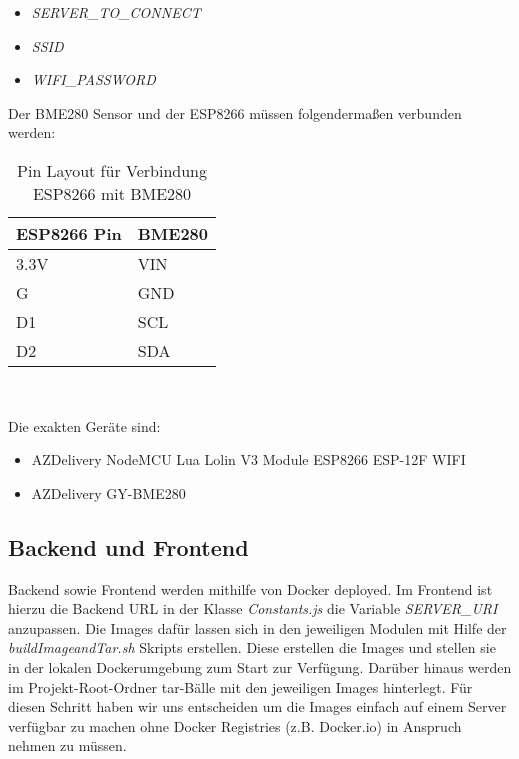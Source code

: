 \begin{itemize}
	\item \textit{SERVER\_TO\_CONNECT}
	\item \textit{SSID}
	\item \textit{WIFI\_PASSWORD}
\end{itemize}

Der BME280 Sensor und der ESP8266 müssen folgendermaßen verbunden werden:

\begin{table}[hbt]
	\centering
    \begin{minipage}[t]{.5\textwidth}
        \caption{Pin Layout für Verbindung ESP8266 mit BME280}
        \begin{tabular}{|l|l|}
            \hline
            \textbf{ESP8266 Pin} & \textbf{BME280} \\
            \hline
            3.3V                    & VIN             \\
            \hline
            G                       & GND             \\
            \hline
            D1                      & SCL             \\
            \hline
		D2 & SDA \\
		\hline
	\end{tabular}
	\\
\label{tab:espBmePinout}
\end{minipage}
\end{table}

Die exakten Geräte sind:

\begin{itemize}
    \item AZDelivery NodeMCU Lua Lolin V3 Module ESP8266 ESP-12F WIFI
    \item AZDelivery GY-BME280
\end{itemize}

\subsection{Backend und Frontend}

Backend sowie Frontend werden mithilfe von Docker deployed.
Im Frontend ist hierzu die Backend URL in der Klasse \textit{Constants.js} die Variable \textit{SERVER\_URI} anzupassen.
Die Images dafür lassen sich in den jeweiligen Modulen mit Hilfe der \textit{buildImageandTar.sh} Skripts erstellen.
Diese erstellen die Images und stellen sie in der lokalen Dockerumgebung zum Start zur Verfügung.
Darüber hinaus werden im Projekt-Root-Ordner tar-Bälle mit den jeweiligen Images hinterlegt.
Für diesen Schritt haben wir uns entscheiden um die Images einfach auf einem Server verfügbar zu machen ohne Docker Registries (z.B. Docker.io) in Anspruch nehmen zu müssen.

